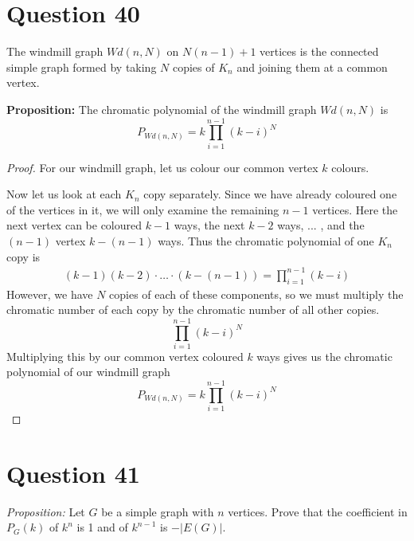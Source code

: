\documentclass[11pt, oneside]{article}   	%
\begin{document}
\section*{Question 40}

The windmill graph $Wd(n, N)$ on $N(n - 1) + 1$ vertices is the connected simple graph formed by taking $N$ copies of $K_n$ and joining them at a common vertex. 

\textbf{Proposition:}  The chromatic polynomial of the windmill graph $Wd(n, N)$ is $$P_{Wd(n,N)} = k \prod_{i=1}^{n-1} (k-i)^N$$

\begin{proof}
For our windmill graph, let us colour our common vertex $k$ colours.

Now let us look at each $K_n$ copy separately. Since we have already coloured one of the vertices in it, we will only examine the remaining $n-1$ vertices. Here the next vertex can be coloured $k-1$ ways, the next $k-2$ ways, ... , and the $(n-1)$ vertex $k-(n-1)$ ways. Thus the chromatic polynomial of one $K_n$ copy is
	\begin{align*}
		(k-1)(k-2)\cdot \ldots \cdot (k-(n-1)) = \prod_{i=1}^{n-1} (k-i)
	\end{align*}
However, we have $N$ copies of each of these components, so we must multiply the chromatic number of each copy by the chromatic number of all other copies.
$$\prod_{i=1}^{n-1} (k-i)^N$$
Multiplying this by our common vertex coloured $k$ ways gives us the chromatic polynomial of our windmill graph
 $$P_{Wd(n,N)} = k \prod_{i=1}^{n-1} (k-i)^N$$
\end{proof}



\section*{Question 41}

\emph{Proposition:} Let $G$ be a simple graph with $n$ vertices. Prove that the coefficient in $P_G(k)$ of $k^n$ is 1 and of $k^{n-1}$ is $-|E(G)|$.
\end{document}
